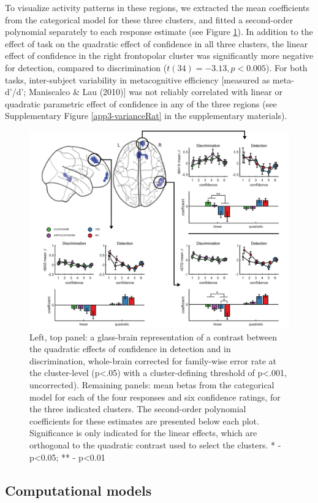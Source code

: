 \documentclass[12pt,twoside]{reedthesis}
\begin{document}
To visualize activity patterns in these regions, we extracted the mean coefficients from the categorical model for these three clusters, and fitted a second-order polynomial separately to each response estimate (see Figure \ref{fig:fMRI-exp1-quadConf}). In addition to the effect of task on the quadratic effect of confidence in all three clusters, the linear effect of confidence in the right frontopolar cluster was significantly more negative for detection, compared to discrimination (\(t(34)=-3.13, p<0.005\)). For both tasks, inter-subject variability in metacognitive efficiency {[}measured as meta-d'/d'; Maniscalco \& Lau (2010){]} was not reliably correlated with linear or quadratic parametric effect of confidence in any of the three regions (see Supplementary Figure \ref{app3-varianceRat} in the supplementary materials).
\begin{figure}
\includegraphics[width=\linewidth]{figure/fMRI/figure5} \caption[Quadratic effect of confidence]{Left, top panel: a glass-brain representation of a contrast between the quadratic effects of confidence in detection and in discrimination, whole-brain corrected for family-wise error rate at the cluster-level (p<.05)  with a cluster-defining threshold of p<.001, uncorrected). Remaining panels: mean betas from the categorical model for each of the four responses and six confidence ratings, for the three indicated clusters. The second-order polynomial coefficients for these estimates are presented below each plot. Significance is only indicated for the linear effects, which are orthogonal to the quadratic contrast used to select the clusters. * - p<0.05; ** - p<0.01}\label{fig:fMRI-exp1-quadConf}
\end{figure}
\hypertarget{computational-models}{%
\subsection{Computational models}\label{computational-models}}
\end{document}
